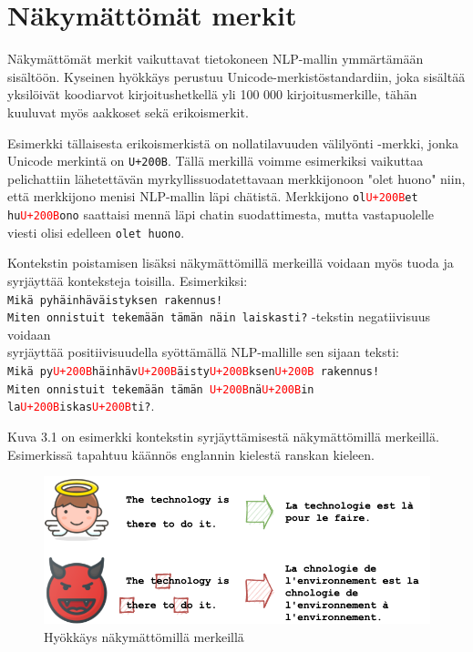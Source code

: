\section{Näkymättömät merkit}
Näkymättömät merkit vaikuttavat tietokoneen NLP-mallin ymmärtämään sisältöön. Kyseinen hyökkäys perustuu Unicode-merkistöstandardiin, joka sisältää yksilöivät koodiarvot kirjoitushetkellä yli 100 000 kirjoitusmerkille, tähän kuuluvat myös aakkoset sekä erikoismerkit.

Esimerkki tällaisesta erikoismerkistä on nollatilavuuden välilyönti -merkki, jonka Unicode merkintä on \texttt{U+200B}. Tällä merkillä voimme esimerkiksi vaikuttaa pelichattiin lähetettävän myrkyllissuodatettavaan merkkijonoon "olet huono" niin, että merkkijono menisi NLP-mallin läpi chätistä. Merkkijono \texttt{ol\textcolor{red}{U+200B}et hu\textcolor{red}{U+200B}ono} saattaisi mennä läpi chatin suodattimesta, mutta vastapuolelle viesti olisi edelleen \texttt{olet huono}.

Kontekstin poistamisen lisäksi näkymättömillä merkeillä voidaan myös tuoda ja syrjäyttää konteksteja toisilla. Esimerkiksi:\\
\texttt{Mikä pyhäinhäväistyksen rakennus!\\
  Miten onnistuit tekemään tämän näin laiskasti?} -tekstin negatiivisuus voidaan\\
syrjäyttää positiivisuudella syöttämällä NLP-mallille sen sijaan teksti:\\
\texttt{Mikä py\textcolor{red}{U+200B}häinhäv\textcolor{red}{U+200B}äisty\textcolor{red}{U+200B}ksen\textcolor{red}{U+200B} rakennus!\\
  Miten onnistuit tekemään tämän \textcolor{red}{U+200B}nä\textcolor{red}{U+200B}in la\textcolor{red}{U+200B}iskas\textcolor{red}{U+200B}ti?}.

Kuva 3.1 on esimerkki kontekstin syrjäyttämisestä näkymättömillä merkeillä. Esimerkissä tapahtuu käännös englannin kielestä ranskan kieleen.
\begin{figure}[hbt]
  \includegraphics[scale=0.5]{figures/invisible.png}
  \caption{Hyökkäys näkymättömillä merkeillä \citep{boucher2021bad}}
\end{figure}



